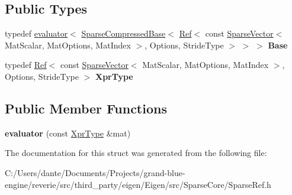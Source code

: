 \subsection*{Public Types}
\begin{DoxyCompactItemize}
\item 
\mbox{\label{struct_eigen_1_1internal_1_1evaluator_3_01_ref_3_01const_01_sparse_vector_3_01_mat_scalar_00_01_a519c1c897a6ea04f0cfeb49f9a37d05_a04470f825a1e6420859a174d51164918}} 
typedef \mbox{\hyperlink{struct_eigen_1_1internal_1_1evaluator}{evaluator}}$<$ \mbox{\hyperlink{class_eigen_1_1_sparse_compressed_base}{Sparse\+Compressed\+Base}}$<$ \mbox{\hyperlink{class_eigen_1_1_ref}{Ref}}$<$ const \mbox{\hyperlink{class_eigen_1_1_sparse_vector}{Sparse\+Vector}}$<$ Mat\+Scalar, Mat\+Options, Mat\+Index $>$, Options, Stride\+Type $>$ $>$ $>$ {\bfseries Base}
\item 
\mbox{\label{struct_eigen_1_1internal_1_1evaluator_3_01_ref_3_01const_01_sparse_vector_3_01_mat_scalar_00_01_a519c1c897a6ea04f0cfeb49f9a37d05_a459863657e03cb2a0643634215802a60}} 
typedef \mbox{\hyperlink{class_eigen_1_1_ref}{Ref}}$<$ const \mbox{\hyperlink{class_eigen_1_1_sparse_vector}{Sparse\+Vector}}$<$ Mat\+Scalar, Mat\+Options, Mat\+Index $>$, Options, Stride\+Type $>$ {\bfseries Xpr\+Type}
\end{DoxyCompactItemize}
\subsection*{Public Member Functions}
\begin{DoxyCompactItemize}
\item 
\mbox{\label{struct_eigen_1_1internal_1_1evaluator_3_01_ref_3_01const_01_sparse_vector_3_01_mat_scalar_00_01_a519c1c897a6ea04f0cfeb49f9a37d05_a319221e2add4fb7671100559f55f3008}} 
{\bfseries evaluator} (const \mbox{\hyperlink{class_eigen_1_1_ref_3_01const_01_sparse_vector_3_01_mat_scalar_00_01_mat_options_00_01_mat_index673660e6a13ed7a7b712b0f75a25d720}{Xpr\+Type}} \&mat)
\end{DoxyCompactItemize}


The documentation for this struct was generated from the following file\+:\begin{DoxyCompactItemize}
\item 
C\+:/\+Users/dante/\+Documents/\+Projects/grand-\/blue-\/engine/reverie/src/third\+\_\+party/eigen/\+Eigen/src/\+Sparse\+Core/Sparse\+Ref.\+h\end{DoxyCompactItemize}

